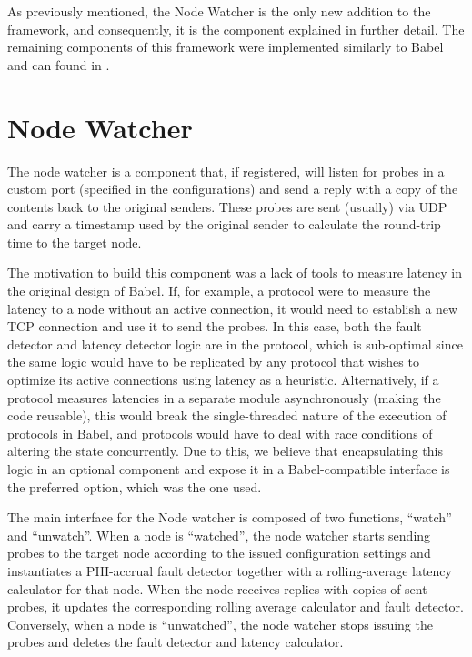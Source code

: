 As previously mentioned, the  Node Watcher is the only new addition to the framework, and consequently, it is the component explained in further detail. The remaining components of this framework were implemented similarly to Babel  and can found in .

\section{Node Watcher} \label{sec:GO-Babel}

The node watcher is a component that, if registered, will listen for probes in a custom port (specified in the configurations) and send a reply with a copy of the contents back to the original senders. These probes are sent (usually) via UDP and carry a timestamp used by the original sender to calculate the round-trip time to the target node.

The motivation to build this component was a lack of tools to measure latency in the original design of Babel. If, for example, a protocol were to measure the latency to a node without an active connection, it would need to establish a new TCP connection and use it to send the probes. In this case, both the fault detector and latency detector logic are in the protocol, which is sub-optimal since the same logic would have to be replicated by any protocol that wishes to optimize its active connections using latency as a heuristic. Alternatively, if a protocol measures latencies in a separate module asynchronously (making the code reusable), this would break the single-threaded nature of the execution of protocols in Babel, and protocols would have to deal with race conditions of altering the state concurrently. Due to this, we believe that encapsulating this logic in an optional component and expose it in a Babel-compatible interface is the preferred option, which was the one used.

The main interface for the Node watcher is composed of two functions, ``watch'' and ``unwatch''. When a node is ``watched'', the node watcher starts sending probes to the target node according to the issued configuration settings and instantiates a PHI-accrual fault detector  together with a rolling-average latency calculator for that node. When the node receives replies with copies of sent probes, it updates the corresponding rolling average calculator and fault detector. Conversely, when a node is ``unwatched'', the node watcher stops issuing the probes and deletes the fault detector and latency calculator.


